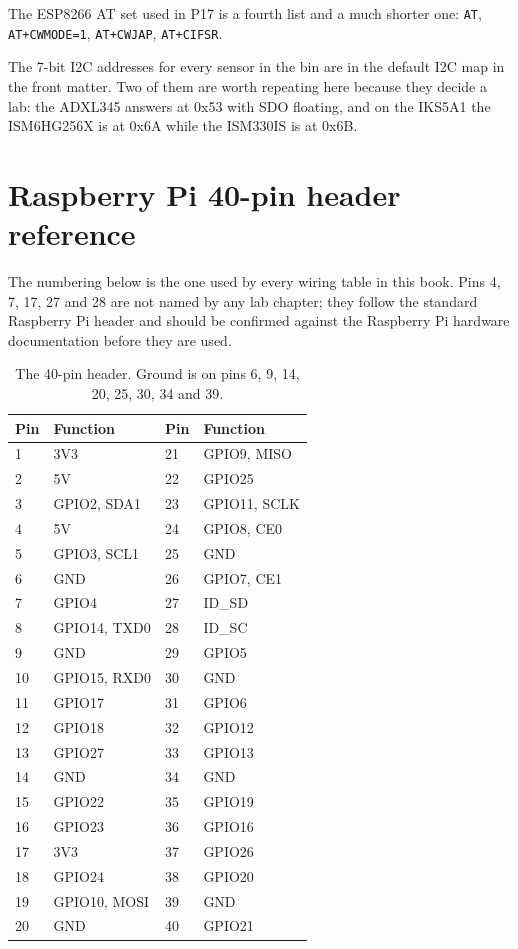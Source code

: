 The ESP8266 AT set used in P17 is a fourth list and a much shorter one: \texttt{AT}, \texttt{AT+CWMODE=1}, \texttt{AT+CWJAP}, \texttt{AT+CIFSR}.

The 7-bit I2C addresses for every sensor in the bin are in the default I2C map in the front matter. Two of them are worth repeating here because they decide a lab: the ADXL345 answers at 0x53 with SDO floating, and on the IKS5A1 the ISM6HG256X is at 0x6A while the ISM330IS is at 0x6B.

\section{Raspberry Pi 40-pin header reference}

The numbering below is the one used by every wiring table in this book. Pins 4, 7, 17, 27 and 28 are not named by any lab chapter; they follow the standard Raspberry Pi header and should be confirmed against the Raspberry Pi hardware documentation before they are used.

\begin{table}[H]\centering\small
\begin{tabular}{p{14mm}p{42mm}p{14mm}p{42mm}}
\toprule
Pin & Function & Pin & Function \\
\midrule
1 & 3V3 & 21 & GPIO9, MISO \\
2 & 5V & 22 & GPIO25 \\
3 & GPIO2, SDA1 & 23 & GPIO11, SCLK \\
4 & 5V & 24 & GPIO8, CE0 \\
5 & GPIO3, SCL1 & 25 & GND \\
6 & GND & 26 & GPIO7, CE1 \\
7 & GPIO4 & 27 & ID\_SD \\
8 & GPIO14, TXD0 & 28 & ID\_SC \\
9 & GND & 29 & GPIO5 \\
10 & GPIO15, RXD0 & 30 & GND \\
11 & GPIO17 & 31 & GPIO6 \\
12 & GPIO18 & 32 & GPIO12 \\
13 & GPIO27 & 33 & GPIO13 \\
14 & GND & 34 & GND \\
15 & GPIO22 & 35 & GPIO19 \\
16 & GPIO23 & 36 & GPIO16 \\
17 & 3V3 & 37 & GPIO26 \\
18 & GPIO24 & 38 & GPIO20 \\
19 & GPIO10, MOSI & 39 & GND \\
20 & GND & 40 & GPIO21 \\
\bottomrule
\end{tabular}
\caption{The 40-pin header. Ground is on pins 6, 9, 14, 20, 25, 30, 34 and 39.}
\end{table}

